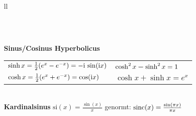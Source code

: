 \documentclass[german,color,5pt]{latex4ei/latex4ei_fs}
\begin{document}
\begin{sectionbox}
\begin{tablebox}{ll}
	 	
	 	 \\
	 	 \\
	 	
	\end{tablebox}
		\textbf{Sinus/Cosinus Hyperbolicus}\\ 
		\begin{tabular*}{\columnwidth}{@{\extracolsep\fill}ll@{}}
		$\sinh x = \frac{1}{2}(e^x -e^{-x})= - \mathrm{i} \, \sin(\mathrm{i} x)$ & $\cosh^2 x  \boldsymbol{-} \sinh^2 x = 1$\\
		$\cosh x  = \frac{1}{2}(e^x +e^{-x})= \cos(\mathrm{i} x)$ & $\cosh x + \sinh x = e^{x}$\\
		\end{tabular*}\\
		\textbf{Kardinalsinus} $\mathrm{si}(x) = \frac{\sin(x)}{x}$ \qquad genormt: $\operatorname{sinc}(x) = \frac{\sin(\pi x)}{\pi x}$
\end{sectionbox}
\end{document}
